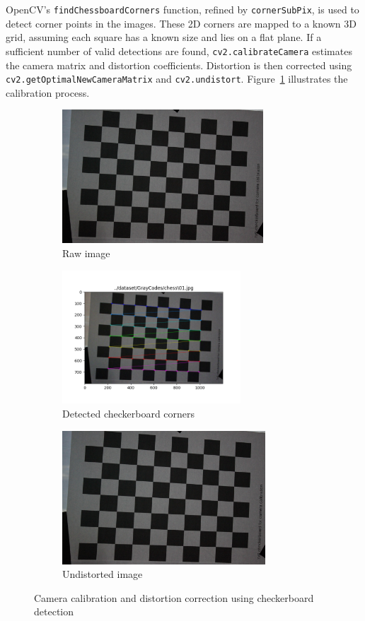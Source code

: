 \documentclass{report}
\begin{document}
OpenCV's \texttt{findChessboardCorners} function, refined by \texttt{cornerSubPix}, is used to detect corner points in the images. These 2D corners are mapped to a known 3D grid, assuming each square has a known size and lies on a flat plane. If a sufficient number of valid detections are found, \texttt{cv2.calibrateCamera} estimates the camera matrix and distortion coefficients. Distortion is then corrected using \texttt{cv2.getOptimalNewCameraMatrix} and \texttt{cv2.undistort}. Figure~\ref{fig:call} illustrates the calibration process.

\begin{figure}[H]
    \centering
    \begin{subfigure}[b]{0.45\linewidth}
        \centering
        \includegraphics[height=50mm, keepaspectratio]{report_images/2Calibration/raw.jpg}
        \caption{Raw image}
    \end{subfigure}
    \hfill
    \begin{subfigure}[b]{0.45\linewidth}
        \centering
        \includegraphics[height=50mm, keepaspectratio]{report_images/2Calibration/corners.png}
        \caption{Detected checkerboard corners}
    \end{subfigure}
    \hfill
    \begin{subfigure}[b]{0.45\linewidth}
        \centering
        \includegraphics[height=50mm, keepaspectratio]{report_images/2Calibration/undistorted.jpg}
        \caption{Undistorted image}
    \end{subfigure}
    \caption{Camera calibration and distortion correction using checkerboard detection}
    \label{fig:call}
\end{figure}
\end{document}
